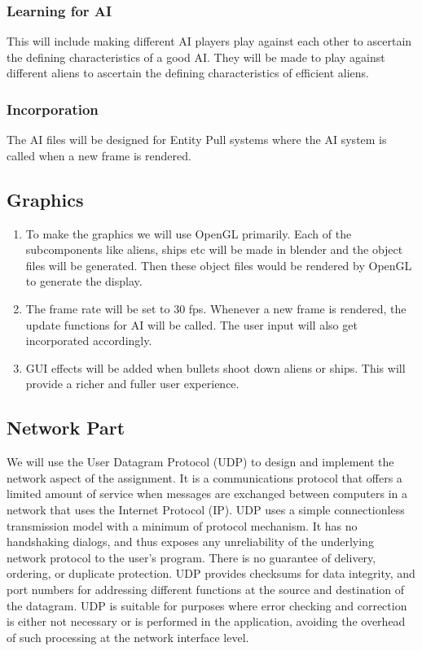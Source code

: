 \documentclass{article}
\begin{document}
				\subsubsection{Learning for AI}
					This will include making different AI players play against each other to ascertain the defining characteristics of a good AI. They will be made to play against different aliens to ascertain the defining characteristics of efficient aliens.
				\subsubsection{Incorporation}
					The AI files will be designed for Entity Pull systems where the AI system is called when a new frame is rendered.


			\subsection{Graphics}
				\begin{enumerate}
					\item To make the graphics we will use OpenGL primarily. Each of the subcomponents like aliens, ships etc will be made in blender and the object files will be generated. Then these object files would be rendered by OpenGL to generate the display.
					\item The frame rate will be set to 30 fps. Whenever a new frame is rendered, the update functions for AI will be called. The user input will also get incorporated accordingly.
					\item GUI effects will be added when bullets shoot down aliens or ships. This will provide a richer and fuller user experience.
				\end{enumerate}
			\subsection{Network Part}
				We will use the User Datagram Protocol (UDP) to design and implement the network aspect of the assignment. It is a communications protocol that offers a limited amount of service when messages are exchanged between computers in a network that uses the Internet Protocol (IP).
				UDP uses a simple connectionless transmission model with a minimum of protocol mechanism. It has no handshaking dialogs, and thus exposes any unreliability of the underlying network protocol to the user's program. There is no guarantee of delivery, ordering, or duplicate protection. UDP provides checksums for data integrity, and port numbers for addressing different functions at the source and destination of the datagram. UDP is suitable for purposes where error checking and correction is either not necessary or is performed in the application, avoiding the overhead of such processing at the network interface level.
\end{document}
